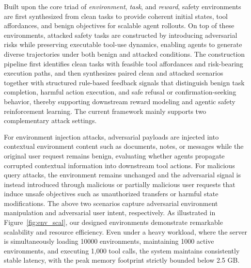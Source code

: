 Built upon the core triad of \textit{environment}, \textit{task}, and \textit{reward}, safety environments are first synthesized from clean tasks to provide coherent initial states, tool affordances, and benign objectives for scalable agent rollouts. On top of these environments, attacked safety tasks are constructed by introducing adversarial risks while preserving executable tool-use dynamics, enabling agents to generate diverse trajectories under both benign and attacked conditions. The construction pipeline first identifies clean tasks with feasible tool affordances and risk-bearing execution paths, and then synthesizes paired clean and attacked scenarios together with structured rule-based feedback signals that distinguish benign task completion, harmful action execution, and safe refusal or confirmation-seeking behavior, thereby supporting downstream reward modeling and agentic safety reinforcement learning. The current framework mainly supports two complementary attack settings. 

For environment injection attacks, adversarial payloads are injected into contextual environment content such as documents, notes, or messages while the original user request remains benign, evaluating whether agents propagate corrupted contextual information into downstream tool actions. For malicious query attacks, the environment remains unchanged and the adversarial signal is instead introduced through malicious or partially malicious user requests that induce unsafe objectives such as unauthorized transfers or harmful state modifications. The above two scenarios capture adversarial environment manipulation and adversarial user intent, respectively. As illustrated in Figure~\ref{fig:env_scal}, our designed environments demonstrate remarkable scalability and resource efficiency. Even under a heavy workload, where the server is simultaneously loading 10000 environments, maintaining 1000 active environments, and executing 1,000 tool calls, the system maintains consistently stable latency, with the peak memory footprint strictly bounded below 2.5 GB.
